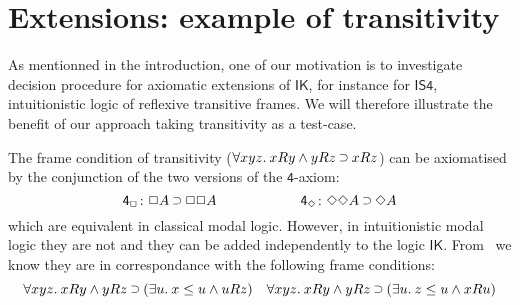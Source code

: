 \documentclass[twoside]{aiml20}
\newcommand{\todo}[1]{\textcolor{red}{TODO: #1}}
\newcommand{\B}{\mathcal{B}}
\newcommand{\Left}{\mathcal{L}}
\newcommand{\Right}{\mathcal{R}}
\newcommand*{\rn}[1]  {\ensuremath{\mathsf{#1}}}
\newcommand*{\fm}[1]{#1}%
\newcommand*{\lb}[1]{#1}%
\newcommand*{\accs}[2]{\lb{#1}R\lb{#2}}
\newcommand*{\futs}[2]{\lb{#1}\le{\lb{#2}}}
\newcommand*{\ax}[1]{\mathsf{#1}}
\newcommand*{\K}{\mathsf{K}}
\newcommand*{\IK}{\mathsf{IK}}
\newcommand*{\AND}{\mathbin{\wedge}}
\newcommand*{\IMP}{\mathbin{\scalebox{.9}{\raise.2ex\hbox{$\supset$}}}}
\newcommand*{\BOX}{\mathord{\Box}}
\newcommand*{\DIA}{\mathord{\Diamond}}
\newcommand{\SEQ}{\Rightarrow}
\begin{document}

\section{Extensions: example of transitivity}\label{sec:extensions}

As mentionned in the introduction, one of our motivation is to investigate decision procedure for axiomatic extensions of $\IK$, for instance for $\mathsf{IS4}$, intuitionistic logic of reflexive transitive frames.
%
We will therefore illustrate the benefit of our approach taking transitivity as a test-case.

%

The frame condition of transitivity ($\forall \lb {xyz}.\:\accs xy\AND \accs yz\IMP\accs xz$) can be axiomatised by the conjunction of the two versions of the $\ax 4$-axiom:\vspace*{-.2cm}
$$
\ax{4_{\BOX}}\colon\fm{\BOX A\IMP \BOX\BOX A}
\qquad\qquad\qquad
\ax{4_{\DIA}}\colon\fm{\DIA\DIA A\IMP\DIA A}
$$%
%
which are equivalent in classical modal logic. 
%
However, in intuitionistic modal logic they are not and they can be added independently to the logic $\IK$. %
%
From~\cite{plotkin1986} we know they are in correspondance with the following frame conditions:\vspace*{-.2cm}
\begin{equation}
\label{eq:4frame}
\forall\lb{xyz}.\:\accs xy\AND \accs yz\IMP(\exists\lb{u}.\:\futs x{u}\AND\accs {u}z)
\quad
\forall\lb{xyz}.\:\accs xy\AND \accs yz\IMP(\exists\lb{u}.\:\futs z{u}\AND\accs {x}{u})
\end{equation}
\end{document}
